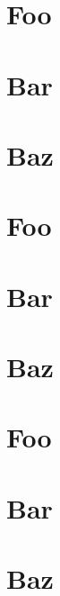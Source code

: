 \documentclass[a4paper]{article}
\begin{document}
\tableofcontents
\newpage

\section{Foo}
\blindtext[2]

\section{Bar}

\section{Baz}

\section{Foo}
\blindtext[2]

\section{Bar}

\section{Baz}

\section{Foo}
\blindtext[2]

\section{Bar}

\section{Baz}
\end{document}
